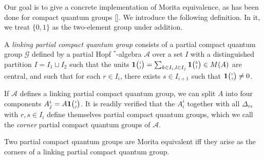 Our goal is to give a concrete implementation of Morita equivalence, as has been done for compact quantum groups []. We introduce the following definition. In it, we treat $\{0,1\}$ as the two-element group under addition.

\begin{Def} A \emph{linking partial compact quantum group} consists of a partial compact quantum group $\mathscr{G}$ defined by a partial Hopf $^*$-algebra $\mathscr{A}$ over a set $I$ with a distinguished partition $I = I_1\sqcup I_2$ such that the units $\mathbf{1}{\tiny {\begin{pmatrix} i\\j\end{pmatrix}}} = \sum_{k\in I_i,l\in I_j} \mathbf{1}{\tiny {\begin{pmatrix} k\\l\end{pmatrix}}} \in M(A)$ are central, and such that for each $r\in I_i$, there exists $s\in I_{i+1}$ such that $\mathbf{1}{\tiny {\begin{pmatrix} r\\s\end{pmatrix}}}\neq 0$.
\end{Def}

If $\mathscr{A}$ defines a linking partial compact quantum group, we can split $A$ into four components $A^i_j = A\mathbf{1}{\tiny {\begin{pmatrix} i\\j\end{pmatrix}}}$. It is readily verified that the $A^i_i$ together with all $\Delta_{rs}$ with $r,s \in I_i$ define themselves partial compact quantum groups, which we call the \emph{corner} partial compact quantum groups of $\mathscr{A}$. 

\begin{Prop} Two partial compact quantum groups are Morita equivalent iff they arise as the corners of a linking partial compact quantum group.
\end{Prop}

